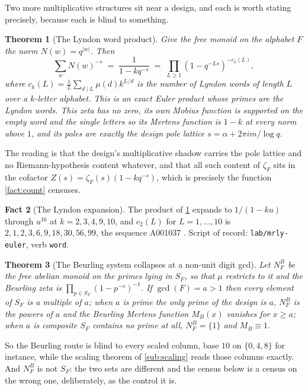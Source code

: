 \documentclass[11pt]{amsart}
\newtheorem{theorem}{Theorem}[section]
\theoremstyle{definition}
\newtheorem{fact}[theorem]{Fact}
\theoremstyle{remark}
\begin{document}
Two more multiplicative structures sit near a design, and each is worth stating precisely, because each is blind to something.

\begin{theorem}[The Lyndon word product]
\label{thm:lyndon}
Give the free monoid on the alphabet $F$ the norm $N(w) = q^{|w|}$. Then
\[
  \sum_{w} N(w)^{-s} \;=\; \frac{1}{1 - k q^{-s}} \;=\; \prod_{L \ge 1} \left(1 - q^{-Ls}\right)^{-c_{k}(L)},
\]
where $c_{k}(L) = \frac{1}{L}\sum_{d \mid L}\mu(d)k^{L/d}$ is the number of Lyndon words of length $L$ over a $k$-letter alphabet. This is an exact Euler product whose primes are the Lyndon words. This zeta has no zero, its own Mobius function is supported on the empty word and the single letters so its Mertens function is $1 - k$ at every norm above $1$, and its poles are exactly the design pole lattice $s = \alpha + 2\pi i m/\log q$.
\end{theorem}

The reading is that the design's multiplicative shadow carries the pole lattice and no Riemann-hypothesis content whatever, and that all such content of $\zeta_{F}$ sits in the cofactor $Z(s) = \zeta_{F}(s)(1 - k q^{-s})$, which is precisely the function \cref{fact:count} censuses.

\begin{fact}[The Lyndon expansion]
\label{fact:lyndon}
The product of \cref{thm:lyndon} expands to $1/(1 - ku)$ through $u^{16}$ at $k = 2,3,4,9,10$, and $c_{2}(L)$ for $L = 1,\dots,10$ is $2, 1, 2, 3, 6, 9, 18, 30, 56, 99$, the sequence A001037 \cite{a1037}. Script of record: \texttt{lab/mrly-euler}, verb \texttt{word}.
\end{fact}

\begin{theorem}[The Beurling system collapses at a non-unit digit gcd]
\label{thm:beurling}
Let $N_{F}^{B}$ be the free abelian monoid on the primes lying in $S_{F}$, so that $\mu$ restricts to it and the Beurling zeta is $\prod_{p \in S_{F}}(1 - p^{-s})^{-1}$. If $\gcd(F) = a > 1$ then every element of $S_{F}$ is a multiple of $a$; when $a$ is prime the only prime of the design is $a$, $N_{F}^{B}$ is the powers of $a$ and the Beurling Mertens function $M_{B}(x)$ vanishes for $x \ge a$; when $a$ is composite $S_{F}$ contains no prime at all, $N_{F}^{B} = \{1\}$ and $M_{B} \equiv 1$.
\end{theorem}

So the Beurling route is blind to every scaled column, base $10$ on $\{0,4,8\}$ for instance, while the scaling theorem of \cref{sub:scaling} reads those columns exactly. And $N_{F}^{B}$ is not $S_{F}$: the two sets are different and the census below is a census on the wrong one, deliberately, as the control it is.
\end{document}
